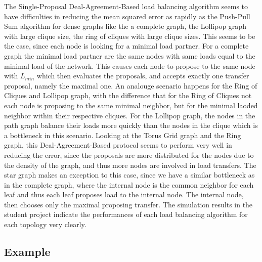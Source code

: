 The Single-Proposal Deal-Agreement-Based load balancing algorithm seems to have difficulties in reducing the mean squared error as rapidly as the Push-Pull Sum algorithm for dense graphs like the a complete graph, the Lollipop graph with large clique size, the ring of cliques with large clique sizes. This seems to be the case, since each node is looking for a minimal load partner. For a complete graph the minimal load partner are the same nodes with same loads equal to the minimal load of the network. This causes each node to propose to the same node with $L_{min}$ which then evaluates the proposals, and accepts exactly one transfer proposal, namely the maximal one. An analouge scenario happens for the Ring of Cliques and Lollipop graph, with the difference that for the Ring of Cliques not each node is proposing to the same minimal neighbor, but for the minimal laoded neighbor within their respective cliques. For the Lollipop graph, the nodes in the path graph balance their loads more quickly than the nodes in the clique which is a bottleneck in this scenario. Looking at the Torus Grid graph and the Ring graph, this Deal-Agreement-Based protocol seems to perform very well in reducing the error, since the proposals are more distributed for the nodes due to the density of the graph, and thus more nodes are involved in load transfers. The star graph makes an exception to this case, since we have a similar bottleneck as in the complete graph, where the internal node is the common neighbor for each leaf and thus each leaf proposes load to the internal node. The internal node, then chooses only the maximal proposing transfer. The simulation results in the student project \cite{Bayazitoglu} indicate the performances of each load balancing algorithm for each topology very clearly.
\subsection{Example}\label{subsec:exampleDAB}


